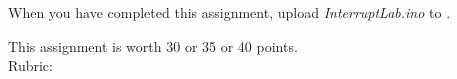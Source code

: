 When you have completed this assignment, upload \textit{InterruptLab.ino} to
\filesubmission.

This assignment is worth 30 or 35 or 40 points. \\

Rubric:
